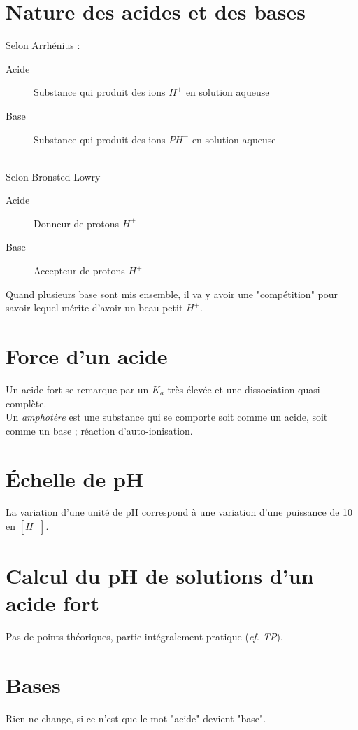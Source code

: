 \documentclass	[11pt, a4paper, openany]{book}
\begin{document}
\section{Nature des acides et des bases}
Selon Arrhénius : 
\begin{description}
	\item[Acide] Substance qui produit des ions $H^+$ en solution aqueuse
	\item[Base] Substance qui produit des ions $PH^-$ en solution aqueuse
\end{description}
\ \\

Selon Bronsted-Lowry 
\begin{description}
	\item[Acide] Donneur de protons $H^+$
	\item[Base] Accepteur de protons $H^+$
\end{description}

Quand plusieurs base sont mis ensemble, il va y avoir une "compétition" pour savoir lequel mérite d'avoir un beau petit $H^+$.

\section{Force d'un acide}
Un acide fort se remarque par un $K_a$ très élevée et une dissociation quasi-complète.\\

Un \textit{amphotère} est une substance qui se comporte soit comme un acide, soit comme un base ; réaction d'auto-ionisation.

\section{Échelle de pH}
La variation d'une unité de pH correspond à une variation d'une puissance de 10 en $[H^+]$.

\section{Calcul du pH de solutions d'un acide fort}
Pas de points théoriques, partie intégralement pratique (\textit{cf. TP}).

\section{Bases}
Rien ne change, si ce n'est que le mot "acide" devient "base".
\end{document}
